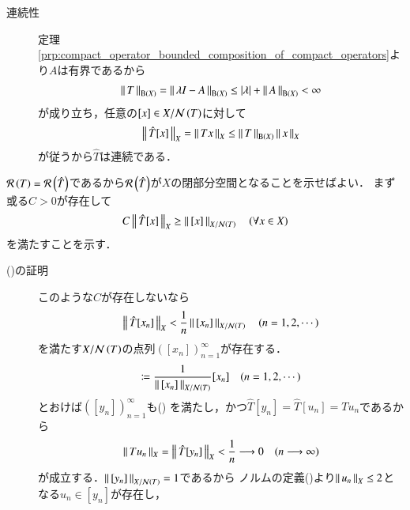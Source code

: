 \begin{prf}
\begin{description}
\begin{description}
					\item[連続性]
						定理\ref{prp:compact_operator_bounded_composition_of_compact_operators}より$A$は有界であるから
						\begin{align}
							\left\|\, T\, \right\|_{\mathrm{B}\left(X\right)} = \left\|\, \lambda I - A\, \right\|_{\mathrm{B}\left(X\right)} \leq |\lambda| + \left\|\, A\, \right\|_{\mathrm{B}\left(X\right)} < \infty
						\end{align}
						が成り立ち，任意の$[x] \in X/\mathcal{N}\left( T \right)$に対して
						\begin{align}
							\left\|\, \hat{T}[x]\, \right\|_{X} = \left\|\, Tx\, \right\|_{X} \leq \left\|\, T\, \right\|_{\mathrm{B}\left(X\right)} \left\|\, x\, \right\|_{X}
						\end{align}
						が従うから$\hat{T}$は連続である．
				\end{description}		
				$\mathcal{R}\left( T \right) = \mathcal{R}\left( \hat{T} \right)$であるから$\mathcal{R}\left( \hat{T} \right)$が$X$の閉部分空間となることを示せばよい．
				まず或る$C > 0$が存在して
				\begin{align}
					C \left\|\, \hat{T}[x]\, \right\|_{X} \geq \left\|\, [x]\, \right\|_{X/\mathcal{N}\left( T \right)} \quad (\forall x \in X)
					\label{eq:thm_Banach_space_compact_operator_kernel_dimension_3}
				\end{align}
				を満たすことを示す．
				\begin{description}
					\item[()の証明]
						このような$C$が存在しないなら
						\begin{align}
							\left\|\, \hat{T}[x_n]\, \right\|_{X} < \frac{1}{n} \left\|\, [x_n]\, \right\|_{X/\mathcal{N}\left( T \right)}
							\quad (n=1,2,\cdots) 
							\label{eq:thm_Banach_space_compact_operator_kernel_dimension}
						\end{align}
						を満たす$X/\mathcal{N}\left( T \right)$の点列$\left( [x_n] \right)_{n=1}^{\infty}$が存在する．
						\begin{align}
							[y_n] \coloneqq \frac{1}{\Norm{[x_n]}{X/\Ker{T}}} [x_n] \quad (n=1,2,\cdots)
						\end{align}
						とおけば$\left( [y_n] \right)_{n=1}^{\infty}$も()
						を満たし，かつ$\hat{T}[y_n] = \hat{T}[u_n] = T u_n$であるから
						\begin{align}
							\left\|\, Tu_n\, \right\|_{X} = \left\|\, \hat{T}[y_n]\, \right\|_{X} < \frac{1}{n} \longrightarrow 0
							\quad (n \longrightarrow \infty)
							\label{eq:thm_Banach_space_compact_operator_kernel_dimension_2}
						\end{align}
						が成立する．$\left\|\, [y_n]\, \right\|_{X/\mathcal{N}\left( T \right)} = 1$であるから
						ノルムの定義()より$\left\|\, u_n\, \right\|_{X} \leq 2$となる$u_n \in [y_n]$が存在し，

\end{description}
\end{description}
\end{prf}
